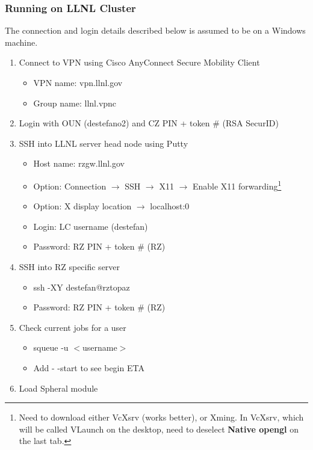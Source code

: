 \documentclass{hitec}
\begin{document}
\subsubsection{Running on LLNL Cluster}
The connection and login details described below is assumed to be on a \textsf{Windows} machine.

\begin{enumerate}
	\item Connect to VPN using \textsf{Cisco AnyConnect Secure Mobility Client}
	\begin{itemize}
		\item VPN name: \textsf{vpn.llnl.gov}
		\item Group name: \textsf{llnl.vpnc}
	\end{itemize}
	\item Login with \textsf{OUN} (\textsf{destefano2}) and \textsf{CZ PIN} + token \# (\textsf{RSA SecurID})
	\item SSH into LLNL server head node using \textsf{Putty}
	\begin{itemize}
		\item Host name: \textsf{rzgw.llnl.gov}
		\item Option: Connection $\rightarrow$ SSH $\rightarrow$ X11 $\rightarrow$ Enable X11 forwarding\footnote{Need to download either \textsf{VcXsrv} (works better), or \textsf{Xming}. In \textsf{VcXsrv}, which will be called \textsf{VLaunch} on the desktop, need to deselect \textbf{Native opengl} on the last tab.}
		\item Option: X display location $\rightarrow$ \textsf{localhost:0}
		\item Login: LC username (destefan)
		\item Password: RZ PIN + token \# (RZ)
	\end{itemize}
	\item SSH into RZ specific server
	\begin{itemize}
		\item \textsf{ssh -XY destefan@rztopaz}
		\item Password: RZ PIN + token \# (RZ)
	\end{itemize}
	\item Check current jobs for a user
	\begin{itemize}
		\item \textsf{squeue -u $<$username$>$}
		\item Add \textsf{- -start} to see begin ETA
	\end{itemize}
	\item Load Spheral module

\end{enumerate}
\end{document}
